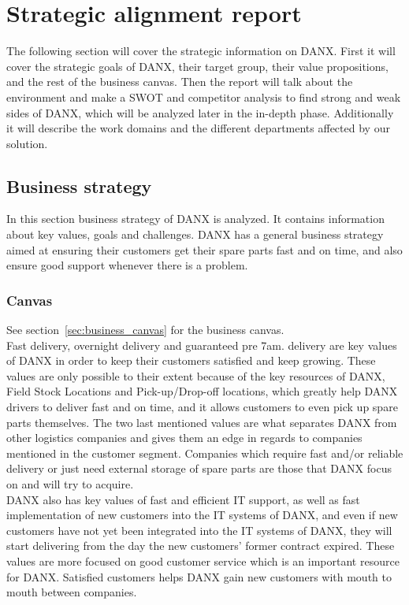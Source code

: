 \chapter{Strategic alignment report}
The following section will cover the strategic information on DANX. First it will cover the strategic goals of DANX, their target group, their value propositions, and the rest of the business canvas. 
Then the report will talk about the environment and make a SWOT and competitor analysis to find strong and weak sides of DANX, which will be analyzed later in the in-depth phase.
Additionally it will describe the work domains and the different departments affected by our solution.

\section{Business strategy}
In this section business strategy of DANX is analyzed. It contains information about key values, goals and challenges.
DANX has a general business strategy aimed at ensuring their customers get their spare parts fast and on time, and also ensure good support whenever there is a problem.

\subsection{Canvas}

See section~\ref{sec:business_canvas} for the business canvas.\\
Fast delivery, overnight delivery and guaranteed pre 7am. delivery are key values of DANX in order to keep their customers satisfied and keep growing\cite{mail}. These values are only possible to their extent because of the key resources of DANX, Field Stock Locations and Pick-up/Drop-off locations, which greatly help DANX drivers to deliver fast and on time, and it allows customers to even pick up spare parts themselves. The two last mentioned values are what separates DANX from other logistics companies and gives them an edge in regards to companies mentioned in the customer segment. Companies which require fast and/or reliable delivery or just need external storage of spare parts are those that DANX focus on and will try to acquire.\\
DANX also has key values of fast and efficient IT support, as well as fast implementation of new customers into the IT systems of DANX, and even if new customers have not yet been integrated into the IT systems of DANX, they will start delivering from the day the new customers' former contract expired. These values are more focused on good customer service which is an important resource for DANX. Satisfied customers helps DANX gain new customers with mouth to mouth between companies.

